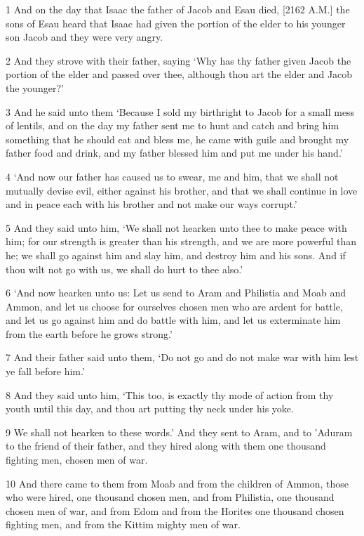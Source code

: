 \par 1 And on the day that Isaac the father of Jacob and Esau died, [2162 A.M.] the sons of Esau heard that Isaac had given the portion of the elder to his younger son Jacob and they were very angry.
\par 2 And they strove with their father, saying ‘Why has thy father given Jacob the portion of the elder and passed over thee, although thou art the elder and Jacob the younger?’
\par 3 And he said unto them ‘Because I sold my birthright to Jacob for a small mess of lentils, and on the day my father sent me to hunt and catch and bring him something that he should eat and bless me, he came with guile and brought my father food and drink, and my father blessed him and put me under his hand.’
\par 4 ‘And now our father has caused us to swear, me and him, that we shall not mutually devise evil, either against his brother, and that we shall continue in love and in peace each with his brother and not make our ways corrupt.’
\par 5 And they said unto him, ‘We shall not hearken unto thee to make peace with him; for our strength is greater than his strength, and we are more powerful than he; we shall go against him and slay him, and destroy him and his sons. And if thou wilt not go with us, we shall do hurt to thee also.’
\par 6 ‘And now hearken unto us: Let us send to Aram and Philistia and Moab and Ammon, and let us choose for ourselves chosen men who are ardent for battle, and let us go against him and do battle with him, and let us exterminate him from the earth before he grows strong.’
\par 7 And their father said unto them, ‘Do not go and do not make war with him lest ye fall before him.’
\par 8 And they said unto him, ‘This too, is exactly thy mode of action from thy youth until this day, and thou art putting thy neck under his yoke.
\par 9 We shall not hearken to these words.’ And they sent to Aram, and to 'Aduram to the friend of their father, and they hired along with them one thousand fighting men, chosen men of war.
\par 10 And there came to them from Moab and from the children of Ammon, those who were hired, one thousand chosen men, and from Philistia, one thousand chosen men of war, and from Edom and from the Horites one thousand chosen fighting men, and from the Kittim mighty men of war.
